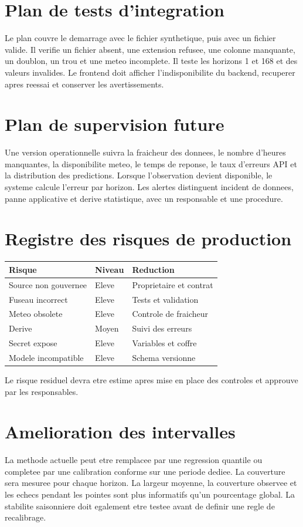 \clearpage
\section{Plan de tests d'integration}
Le plan couvre le demarrage avec le fichier synthetique, puis avec un fichier valide. Il verifie un fichier absent, une extension refusee, une colonne manquante, un doublon, un trou et une meteo incomplete. Il teste les horizons 1 et 168 et des valeurs invalides. Le frontend doit afficher l'indisponibilite du backend, recuperer apres reessai et conserver les avertissements.

\clearpage
\section{Plan de supervision future}
Une version operationnelle suivra la fraicheur des donnees, le nombre d'heures manquantes, la disponibilite meteo, le temps de reponse, le taux d'erreurs API et la distribution des predictions. Lorsque l'observation devient disponible, le systeme calcule l'erreur par horizon. Les alertes distinguent incident de donnees, panne applicative et derive statistique, avec un responsable et une procedure.

\clearpage
\section{Registre des risques de production}
\begin{tabular}{p{4cm}p{3cm}p{6cm}}
\toprule Risque & Niveau & Reduction\\\midrule
Source non gouvernee & Eleve & Proprietaire et contrat\\
Fuseau incorrect & Eleve & Tests et validation\\
Meteo obsolete & Eleve & Controle de fraicheur\\
Derive & Moyen & Suivi des erreurs\\
Secret expose & Eleve & Variables et coffre\\
Modele incompatible & Eleve & Schema versionne\\
\bottomrule
\end{tabular}
\par\medskip
Le risque residuel devra etre estime apres mise en place des controles et approuve par les responsables.

\clearpage
\section{Amelioration des intervalles}
La methode actuelle peut etre remplacee par une regression quantile ou completee par une calibration conforme sur une periode dediee. La couverture sera mesuree pour chaque horizon. La largeur moyenne, la couverture observee et les echecs pendant les pointes sont plus informatifs qu'un pourcentage global. La stabilite saisonniere doit egalement etre testee avant de definir une regle de recalibrage.

